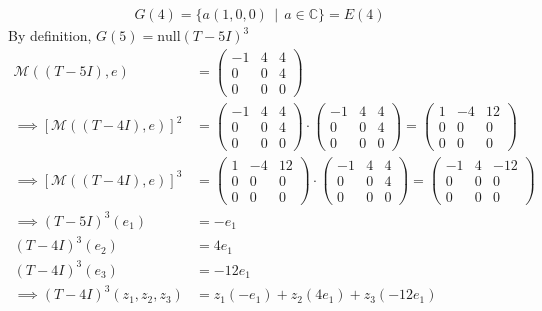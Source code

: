 \documentclass[12pt]{article}
\newcommand{\suchthat}{\, \mid \,}
\begin{document}
\begin{enumerate}[\ \ \it(a)\ \ ]
	\begin{align*}
		G(4) = \{a(1, 0, 0) \suchthat a \in \mathbb{C}\} = E(4)
	\end{align*}
	\noindent By definition, $G(5) = \text{null}(T - 5I)^3$
	\begin{align*}
		\mathcal{M}((T - 5I), e) &= \left(\begin{array}{ccc}
			-1 & 4 & 4 \\
			0 & 0 & 4 \\
			0 & 0 & 0
		\end{array}\right) \\
		\implies [\mathcal{M}((T - 4I), e)]^2 &= \left(\begin{array}{ccc}
			-1 & 4 & 4 \\
			0 & 0 & 4 \\
			0 & 0 & 0
		\end{array}\right) \cdot \left(\begin{array}{ccc}
			-1 & 4 & 4 \\
			0 & 0 & 4 \\
			0 & 0 & 0
		\end{array}\right) = \left(\begin{array}{ccc}
			1 & -4 & 12 \\
			0 & 0 & 0 \\
			0 & 0 & 0
		\end{array}\right) \\
		\implies [\mathcal{M}((T - 4I), e)]^3 &= \left(\begin{array}{ccc}
			1 & -4 & 12 \\
			0 & 0 & 0 \\
			0 & 0 & 0
		\end{array}\right) \cdot \left(\begin{array}{ccc}
			-1 & 4 & 4 \\
			0 & 0 & 4 \\
			0 & 0 & 0
		\end{array}\right) = \left(\begin{array}{ccc}
			-1 & 4 & -12 \\
			0 & 0 & 0 \\
			0 & 0 & 0
		\end{array}\right) \\
		\implies (T - 5I)^3(e_1) &= -e_1 \\
		(T - 4I)^3(e_2) &= 4e_1 \\
		(T - 4I)^3(e_3) &= -12e_1 \\
		\implies (T - 4I)^3(z_1, z_2, z_3) &= z_1(-e_1) + z_2(4e_1) + z_3(-12e_1) \\

\end{align*}
\end{enumerate}
\end{document}
